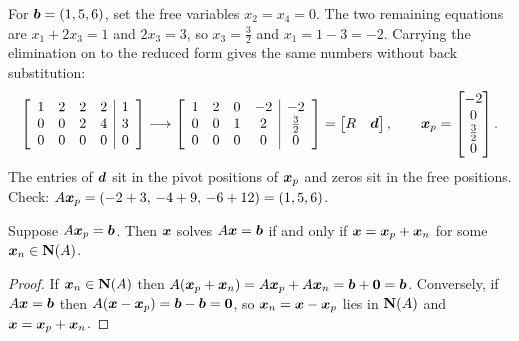 \begin{example}\label{ex:u09-particular}
For $\boldsymbol{b}=(1,5,6)$, set the free variables $x_2=x_4=0$. The two remaining equations are
$x_1+2x_3=1$ and $2x_3=3$, so $x_3=\tfrac32$ and $x_1=1-3=-2$. Carrying the elimination on to
the reduced form gives the same numbers without back substitution:
\[
\left[\begin{array}{cccc|c}1&2&2&2&1\\0&0&2&4&3\\0&0&0&0&0\end{array}\right]
\longrightarrow
\left[\begin{array}{cccc|c}1&2&0&-2&-2\\0&0&1&2&\tfrac32\\0&0&0&0&0\end{array}\right]
=\begin{bmatrix}R&\boldsymbol{d}\end{bmatrix},\qquad
\boldsymbol{x}_p=\begin{bmatrix}-2\\0\\\tfrac32\\0\end{bmatrix}.
\]
The entries of $\boldsymbol{d}$ sit in the pivot positions of $\boldsymbol{x}_p$ and zeros sit in the free
positions. Check: $A\boldsymbol{x}_p=(-2+3,\,-4+9,\,-6+12)=(1,5,6)$.
\end{example}

\begin{theorem}\label{thm:u09-complete}
Suppose $A\boldsymbol{x}_p=\boldsymbol{b}$. Then $\boldsymbol{x}$ solves $A\boldsymbol{x}=\boldsymbol{b}$ if and only if
$\boldsymbol{x}=\boldsymbol{x}_p+\boldsymbol{x}_n$ for some $\boldsymbol{x}_n\in\mathbf{N}(A)$.
\end{theorem}
\begin{proof}
If $\boldsymbol{x}_n\in\mathbf{N}(A)$ then $A(\boldsymbol{x}_p+\boldsymbol{x}_n)=A\boldsymbol{x}_p+A\boldsymbol{x}_n=\boldsymbol{b}+\boldsymbol{0}=\boldsymbol{b}$.
Conversely, if $A\boldsymbol{x}=\boldsymbol{b}$ then $A(\boldsymbol{x}-\boldsymbol{x}_p)=\boldsymbol{b}-\boldsymbol{b}=\boldsymbol{0}$, so
$\boldsymbol{x}_n=\boldsymbol{x}-\boldsymbol{x}_p$ lies in $\mathbf{N}(A)$ and $\boldsymbol{x}=\boldsymbol{x}_p+\boldsymbol{x}_n$.
\end{proof}

